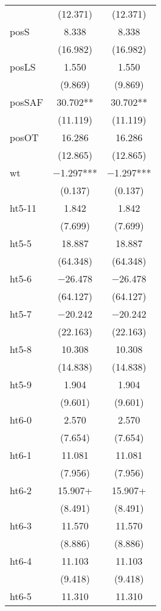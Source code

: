 \documentclass[12pt,english]{article}
\begin{document}
\begin{table}[ht]
\begin{tabular}{lcc}
 & (\num{12.371}) & (\num{12.371})\\
posS & \num{8.338} & \num{8.338}\\
 & (\num{16.982}) & (\num{16.982})\\
posLS & \num{1.550} & \num{1.550}\\
 & (\num{9.869}) & (\num{9.869})\\
posSAF & \num{30.702}** & \num{30.702}**\\
 & (\num{11.119}) & (\num{11.119})\\
posOT & \num{16.286} & \num{16.286}\\
 & (\num{12.865}) & (\num{12.865})\\
wt & \num{-1.297}*** & \num{-1.297}***\\
 & (\num{0.137}) & (\num{0.137})\\
ht5-11 & \num{1.842} & \num{1.842}\\
 & (\num{7.699}) & (\num{7.699})\\
ht5-5 & \num{18.887} & \num{18.887}\\
 & (\num{64.348}) & (\num{64.348})\\
ht5-6 & \num{-26.478} & \num{-26.478}\\
 & (\num{64.127}) & (\num{64.127})\\
ht5-7 & \num{-20.242} & \num{-20.242}\\
 & (\num{22.163}) & (\num{22.163})\\
ht5-8 & \num{10.308} & \num{10.308}\\
 & (\num{14.838}) & (\num{14.838})\\
ht5-9 & \num{1.904} & \num{1.904}\\
 & (\num{9.601}) & (\num{9.601})\\
ht6-0 & \num{2.570} & \num{2.570}\\
 & (\num{7.654}) & (\num{7.654})\\
ht6-1 & \num{11.081} & \num{11.081}\\
 & (\num{7.956}) & (\num{7.956})\\
ht6-2 & \num{15.907}+ & \num{15.907}+\\
 & (\num{8.491}) & (\num{8.491})\\
ht6-3 & \num{11.570} & \num{11.570}\\
 & (\num{8.886}) & (\num{8.886})\\
ht6-4 & \num{11.103} & \num{11.103}\\
 & (\num{9.418}) & (\num{9.418})\\
ht6-5 & \num{11.310} & \num{11.310}\\

\end{tabular}
\end{table}
\end{document}
